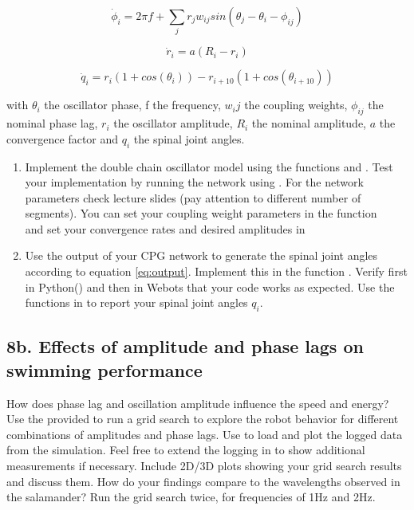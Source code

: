 \documentclass{cmc}
\begin{document}
\begin{equation}
  \label{eq:dphase}
  \dot{\phi}_i = 2 \pi f + \sum_j r_j w_{ij} sin(\theta_j - \theta_i - \phi_{ij})
\end{equation}

\begin{equation}
  \label{eq:dr}
  \dot{r}_i = a (R_i - r_i)
\end{equation}

\begin{equation}
  \label{eq:output}
  \dot{q}_i = r_i(1 + cos(\theta_i)) - r_{i+10}(1 + cos(\theta_{i+10}))
\end{equation}

with $ \theta_i $ the oscillator phase, f the frequency, $ w{_ij} $
the coupling weights, $ \phi_{ij} $ the nominal phase lag, $ r_i $ the
oscillator amplitude, $ R_i $ the nominal amplitude, $ a $ the
convergence factor and $ q_i $ the spinal joint angles.

\begin{enumerate}
\item Implement the double chain oscillator model using the functions
   and
  . Test your implementation by
  running the network using . For the network
  parameters check lecture slides (pay attention to different number
  of segments). You can set your coupling weight parameters in the
  function \\
   and set
  your convergence rates and desired amplitudes in
\item Use the output of your CPG network to generate the spinal joint
  angles according to equation \ref{eq:output}. Implement this in the
  function . Verify first in
  Python() and then in Webots that your code
  works as expected. Use the functions in  to
  report your spinal joint angles $q_i$.
\end{enumerate}


\subsection*{8b. Effects of amplitude and phase lags on swimming performance}
\label{sec:amplitude-phase-performance}

How does phase lag and oscillation amplitude influence the speed and energy? Use
the provided  to run a grid search
to explore the robot behavior for different combinations of amplitudes and phase
lags. Use  to load and plot the logged data from the
simulation. Feel free to extend the logging in  to show
additional measurements if necessary. Include 2D/3D plots showing your grid
search results and discuss them. How do your findings compare to the wavelengths
observed in the salamander? Run the grid search twice, for frequencies of 1Hz
and 2Hz.
\end{document}
